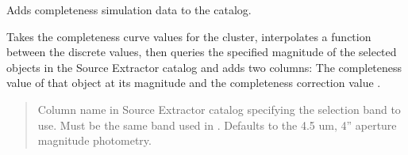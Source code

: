 \documentclass[letterpaper,12pt,english]{sphinxmanual}
\begin{document}
\begin{fulllineitems}
\begin{fulllineitems}
\begin{quote}
\begin{description}
\end{description}\end{quote}

\end{fulllineitems}


\begin{fulllineitems}
\label{\detokenize{api/selector:SPTclIRAGN.Pipeline_functions.SelectIRAGN.completeness_value}}
\pysigstartsignatures
{}
\pysigstopsignatures
\sphinxAtStartPar
Adds completeness simulation data to the catalog.

\sphinxAtStartPar
Takes the completeness curve values for the cluster, interpolates a function between the discrete values, then
queries the specified magnitude of the selected objects in the Source Extractor catalog and adds two columns:
The completeness value of that object at its magnitude and the completeness correction value
.
\begin{quote}\begin{description}
\sphinxAtStartPar
{} \textendash{} Column name in Source Extractor catalog specifying the selection band to use. Must be the same band used in
{\hyperref[\detokenize{api/selector:SPTclIRAGN.Pipeline_functions.SelectIRAGN.object_selection}]{}}. Defaults to the 4.5 um, 4” aperture magnitude photometry.

\end{description}\end{quote}

\end{fulllineitems}



\end{fulllineitems}
\end{document}
